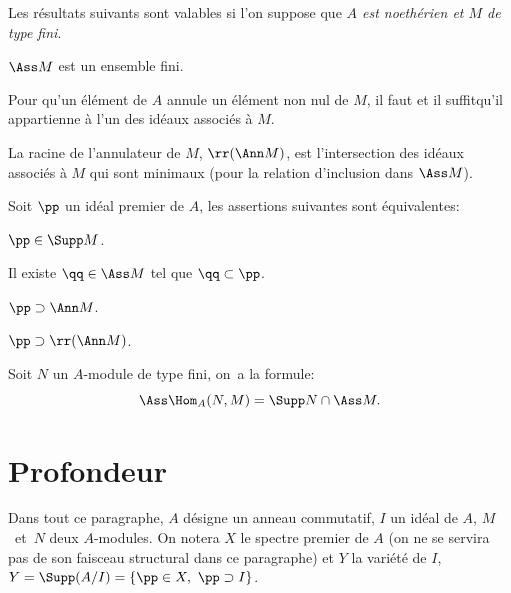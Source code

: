 Les r\'esultats suivants sont valables si l'on suppose que \emph{$A$ est noeth\'erien et $M$ de type fini}.

\setcounter{subsection}{0}

\skpt

\begin{proposition} \label{III.1.1}
\begin{enumeratei}
\item
$\Ass M$ est un ensemble fini.

\item
Pour qu'un \'el\'ement de $A$ annule un \'el\'ement non nul de $M$, il faut et il suffit\pageoriginale qu'il appartienne \`a l'un des id\'eaux associ\'es \`a $M$.

\item
La racine de l'annulateur de $M$, $\rr(\Ann M)$, est l'intersection des id\'eaux associ\'es \`a $M$ qui sont minimaux (pour la relation d'inclusion dans $\Ass M$).
\end{enumeratei}
\end{proposition}

\begin{proposition} \label{III.1.2}
Soit $\pp $ un id\'eal premier de $A$, les assertions suivantes sont \'equivalentes:
\begin{enumeratei}
\item
$\pp \in \Supp M$.

\item
Il existe $\qq \in \Ass M$ tel que $\qq \subset\pp $.

\item
$\pp \supset \Ann M$.

\item[\textup{(iii bis)}]
$\pp \supset \rr(\Ann M)$.
\end{enumeratei}
\end{proposition}

\begin{proposition} \label{III.1.3}
Soit $N$ un $A$-module de type fini, on~a la formule:
\[
\Ass \Hom_A(N, M) = \Supp N \cap \Ass M.
\]
\end{proposition}

\section{Profondeur} \label{III.2}

Dans tout ce paragraphe, $A$ d\'esigne un anneau commutatif, $I$ un id\'eal de $A$, $M$~et~$N$ deux $A$-modules. On notera $X$ le spectre premier de $A$ (on ne se servira pas de son faisceau structural dans ce paragraphe) et $Y$ la vari\'et\'e de $I$, $Y = \Supp(A/I) = \{\pp \in\nobreak X, \ \pp \supset I\}$.

